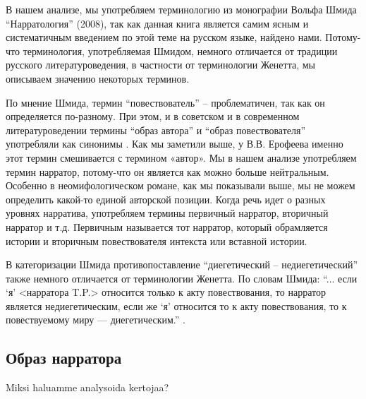 \documentclass[12pt,a4paper]{article}
\begin{document}
В нашем анализе, мы употребляем терминологию из монографии Вольфа Шмида \enquote{Нарратология} (2008), так как данная книга является самим ясным и систематичным введением по этой теме на русском языке, найдено нами. Потому-что терминология, употребляемая Шмидом, немного отличается от традиции русского литературоведения, в частности от терминологии Женетта, мы описываем значению некоторых терминов.
  
По мнение Шмида, термин \enquote{повествователь} -- проблематичен, так как он
определяется по-разному. При этом, и в советском и в современном
литературоведении термины \enquote{образ автора} и \enquote{образ повествователя} употребляли как
синонимы \parencite[67--68]{schmid2008}.  Как мы заметили выше, у В.В.
Ерофеева именно этот термин смешивается с термином «автор». Мы в нашем анализе
употребляем термин нарратор, потому-что он является как можно больше
нейтральным. Особенно в неомифологическом романе, как мы показывали выше, мы не можем определить какой-то единой авторской позиции.  Когда речь идет о разных уровнях нарратива, употребляем термины
первичный нарратор, вторичный нарратор и т.д. Первичным называется тот нарратор,
который  обрамляется истории и вторичным повествователя интекста или вставной истории.

В категоризации Шмида противопоставление \enquote{диегетический -- недиегетический} также немного отличается от терминологии Женетта. По словам Шмида: \enquote{... если \enquote{я} <нарратора T.P.> относится только к акту повествования, то нарратор является недиегетическим, если же \enquote{я} относится то к акту повествования, то к повествуемому миру — диегетическим.} \parencite[84]{schmid2008}.


\subsection{Образ нарратора}

Miksi haluamme analysoida kertojaa? 
\end{document}
